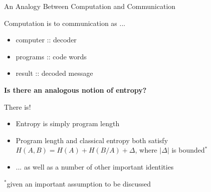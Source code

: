 \documentclass{beamer}
\begin{document}
\begin{frame}{An Analogy Between Computation and Communication}

\begin{structure}{Computation is to communication as ... }
\begin{itemize}

 \item{computer :: decoder}

 \item{programs :: code words}

 \item{result :: decoded message}

\end{itemize}
\end{structure}

\medskip

\textbf{Is there an analogous notion of entropy?}

\medskip

\begin{structure}{There is!}
\begin{itemize}
 \item{Entropy is simply program length}
 \item{Program length and classical entropy both satisfy
       $H(A, B) = H(A) + H(B/A) + \Delta$, where $\vert \Delta \vert$
       is bounded$^*$}
 \item{... as well as a number of other important identities}
\end{itemize}
\end{structure}

\small{$^*$given an important assumption to be discussed}

\end{frame}

\end{document}
